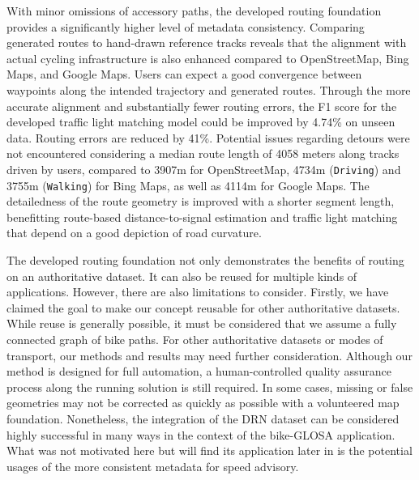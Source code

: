 With minor omissions of accessory paths, the developed routing foundation provides a significantly higher level of metadata consistency. Comparing generated routes to hand-drawn reference tracks reveals that the alignment with actual cycling infrastructure is also enhanced compared to OpenStreetMap, Bing Maps, and Google Maps. Users can expect a good convergence between waypoints along the intended trajectory and generated routes. Through the more accurate alignment and substantially fewer routing errors, the F1 score for the developed traffic light matching model could be improved by 4.74\% on unseen data. Routing errors are reduced by 41\%. Potential issues regarding detours were not encountered considering a median route length of 4058 meters along tracks driven by users, compared to 3907m for OpenStreetMap, 4734m (\texttt{Driving}) and 3755m (\texttt{Walking}) for Bing Maps, as well as 4114m for Google Maps. The detailedness of the route geometry is improved with a shorter segment length, benefitting route-based distance-to-signal estimation and traffic light matching that depend on a good depiction of road curvature.

The developed routing foundation not only demonstrates the benefits of routing on an authoritative dataset. It can also be reused for multiple kinds of applications. However, there are also limitations to consider. Firstly, we have claimed the goal to make our concept reusable for other authoritative datasets. While reuse is generally possible, it must be considered that we assume a fully connected graph of bike paths. For other authoritative datasets or modes of transport, our methods and results may need further consideration. Although our method is designed for full automation, a human-controlled quality assurance process along the running solution is still required. In some cases, missing or false geometries may not be corrected as quickly as possible with a volunteered map foundation. Nonetheless, the integration of the DRN dataset can be considered highly successful in many ways in the context of the bike-GLOSA application. What was not motivated here but will find its application later in  is the potential usages of the more consistent metadata for speed advisory.

